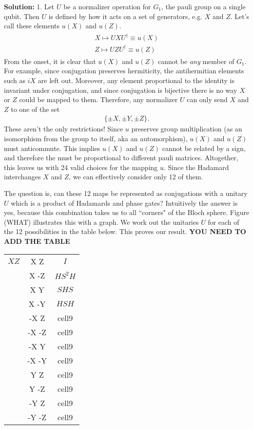 \documentclass{book}
\begin{document}
    \textbf{Solution:} 1. Let $U$ be a normalizer operation for $G_1$, the pauli group on a single qubit. Then $U$ is defined by how it acts on a set of generators, e.g. $X$ and $Z$. Let's call these elements $u(X)$ and $u(Z)$.
    \begin{align}
    \begin{aligned}
        X \mapsto UXU^\dagger \equiv u(X) \\
        Z \mapsto UZU^\dagger \equiv u(Z)
    \end{aligned}
    \end{align}
    From the onset, it is clear that $u(X)$ and $u(Z)$ cannot be \emph{any} member of $G_1$. For example, since conjugation preserves hermiticity, the antihermitian elements such as $i X$ are left out. Moreover, any element proportional to the identity is invariant under conjugation, and since conjugation is bijective there is no way $X$ or $Z$ could be mapped to them. Therefore, any normalizer $U$ can only send $X$ and $Z$ to one of the set
    \begin{align}
        \{\pm X, \pm Y, \pm Z\}. 
    \end{align}
    These aren't the only restrictions! Since $u$ preserves group multiplication (as an isomorphism from the group to itself, aka an automorphism), $u(X)$ and $u(Z)$ must anticommute. This implies $u(X)$ and $u(Z)$ cannot be related by a sign, and therefore the must be proportional to different pauli matrices. Altogether, this leaves us with 24 valid choices for the mapping $u$. Since the Hadamard interchanges $X$ and $Z$, we can effectively consider only 12 of them. 
    
    The question is, can these 12 maps be represented as conjugations with a unitary $U$ which is a product of Hadamards and phase gates? Intuitively the answer is yes, because this combination takes us to all ``corners" of the Bloch sphere. Figure (WHAT) illustrates this with a graph. We work out the unitaries $U$ for each of the 12 possibilities in the table below. This proves our result. \textbf{YOU NEED TO ADD THE TABLE}
    
    \begin{center}
    \begin{tabular}{ |c|c|c| } 
    \hline
        $X Z$& X Z & $I$ \\ 
        & X -Z & $HS^2H$ \\ 
        & X Y & $SHS$ \\
        & X -Y & $HSH$ \\
        & -X Z & cell9 \\
        & -X -Z & cell9 \\
        & -X Y & cell9 \\
        & -X -Y & cell9 \\
        & Y Z & cell9 \\
        & Y -Z & cell9 \\
        & -Y Z & cell9 \\
        & -Y -Z & cell9 \\
    \hline
    \end{tabular}
    \end{center}
    
\end{document}
